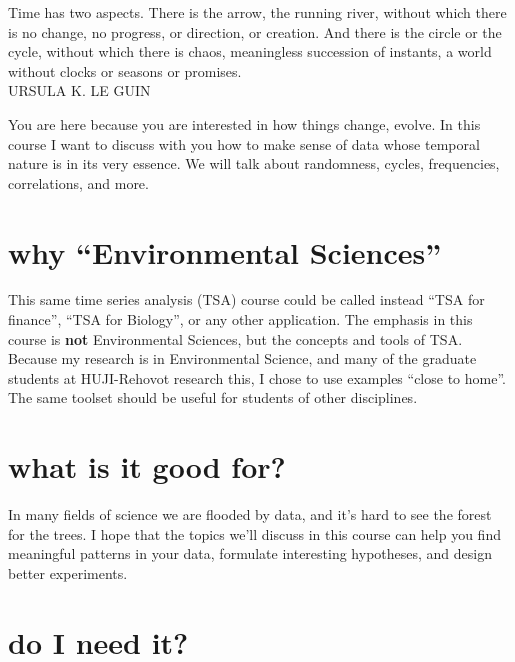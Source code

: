\documentclass[
  letterpaper,
  DIV=11,
  numbers=noendperiod,
  oneside]{scrreprt}
\begin{document}

Time has two aspects. There is the arrow, the running river, without
which there is no change, no progress, or direction, or creation. And
there is the circle or the cycle, without which there is chaos,
meaningless succession of instants, a world without clocks or seasons or
promises.\\
URSULA K. LE GUIN

You are here because you are interested in how things change, evolve. In
this course I want to discuss with you how to make sense of data whose
temporal nature is in its very essence. We will talk about randomness,
cycles, frequencies, correlations, and more.

\hypertarget{why-environmental-sciences}{%
\section*{why ``Environmental
Sciences''}\label{why-environmental-sciences}}


This same time series analysis (TSA) course could be called instead
``TSA for finance'', ``TSA for Biology'', or any other application. The
emphasis in this course is \textbf{not} Environmental Sciences, but the
concepts and tools of TSA. Because my research is in Environmental
Science, and many of the graduate students at HUJI-Rehovot research
this, I chose to use examples ``close to home''. The same toolset should
be useful for students of other disciplines.

\hypertarget{what-is-it-good-for}{%
\section*{what is it good for?}\label{what-is-it-good-for}}


In many fields of science we are flooded by data, and it's hard to see
the forest for the trees. I hope that the topics we'll discuss in this
course can help you find meaningful patterns in your data, formulate
interesting hypotheses, and design better experiments.

\hypertarget{do-i-need-it}{%
\section*{do I need it?}\label{do-i-need-it}}
\end{document}
